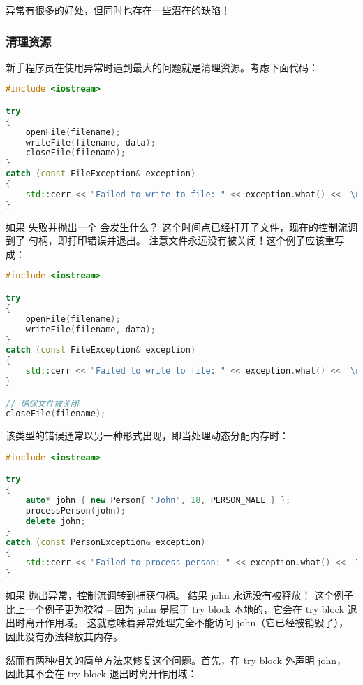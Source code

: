 \documentclass[../../LearnCpp.tex]{subfiles}
\begin{document}

异常有很多的好处，但同时也存在一些潜在的缺陷！

\subsubsection*{清理资源}

新手程序员在使用异常时遇到最大的问题就是清理资源。考虑下面代码：

\begin{lstlisting}[language=C++]
#include <iostream>

try
{
    openFile(filename);
    writeFile(filename, data);
    closeFile(filename);
}
catch (const FileException& exception)
{
    std::cerr << "Failed to write to file: " << exception.what() << '\n';
}
\end{lstlisting}

如果  失败并抛出一个  会发生什么？
这个时间点已经打开了文件，现在的控制流调到了  句柄，即打印错误并退出。
注意文件永远没有被关闭！这个例子应该重写成：

\begin{lstlisting}[language=C++]
#include <iostream>

try
{
    openFile(filename);
    writeFile(filename, data);
}
catch (const FileException& exception)
{
    std::cerr << "Failed to write to file: " << exception.what() << '\n';
}

// 确保文件被关闭
closeFile(filename);
\end{lstlisting}

该类型的错误通常以另一种形式出现，即当处理动态分配内存时：

\begin{lstlisting}[language=C++]
#include <iostream>

try
{
    auto* john { new Person{ "John", 18, PERSON_MALE } };
    processPerson(john);
    delete john;
}
catch (const PersonException& exception)
{
    std::cerr << "Failed to process person: " << exception.what() << '\n';
}
\end{lstlisting}

如果  抛出异常，控制流调转到捕获句柄。
结果 john 永远没有被释放！
这个例子比上一个例子更为狡猾 --
因为 john 是属于 try block 本地的，它会在 try block 退出时离开作用域。
这就意味着异常处理完全不能访问 john（它已经被销毁了），因此没有办法释放其内存。

然而有两种相关的简单方法来修复这个问题。首先，在 try block 外声明 john，
因此其不会在 try block 退出时离开作用域：
\end{document}
